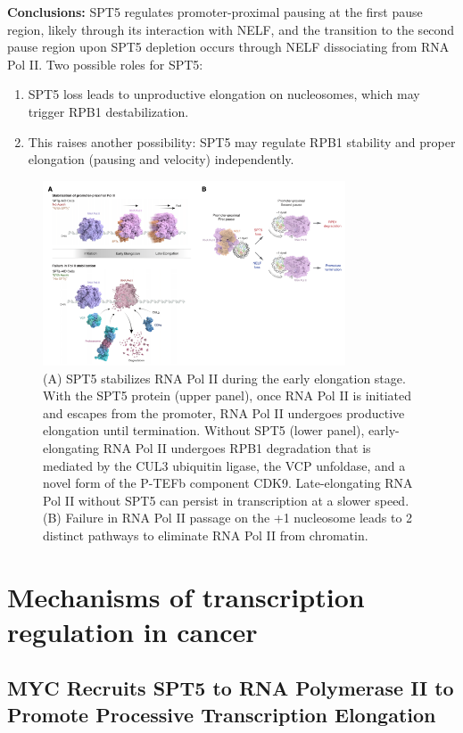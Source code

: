 \textbf{Conclusions:}
SPT5 regulates promoter-proximal pausing at the first pause region, likely through its interaction with NELF, and the transition to the second pause region upon SPT5 depletion occurs through NELF dissociating from RNA Pol II.
Two possible roles for SPT5:
\begin{enumerate}
\tightlist
\item SPT5 loss leads to unproductive elongation on nucleosomes, which may trigger RPB1 destabilization.
\item This raises another possibility: SPT5 may regulate RPB1 stability and
proper elongation (pausing and velocity) independently.
\end{enumerate}

\begin{figure}
\centering
\includegraphics[width=0.8\textwidth]{../_resources/Screen_Shot_2022-12-19_at_17-00-41.png}
\caption{(A) SPT5 stabilizes RNA Pol II during the early elongation stage. With the SPT5 protein (upper panel), once RNA Pol II is initiated and escapes from the promoter, RNA Pol II undergoes productive elongation until termination. Without SPT5 (lower panel), early-elongating RNA Pol II undergoes RPB1 degradation that is mediated by the CUL3 ubiquitin ligase, the VCP unfoldase, and a novel form of the P-TEFb component CDK9. Late-elongating RNA Pol II without SPT5 can persist in transcription at a slower speed.
(B) Failure in RNA Pol II passage on the +1 nucleosome leads to 2 distinct pathways to eliminate RNA Pol II from chromatin.}
\end{figure}

\section{Mechanisms of transcription regulation in cancer}

\subsection{MYC Recruits SPT5 to RNA Polymerase II to Promote Processive Transcription Elongation}

